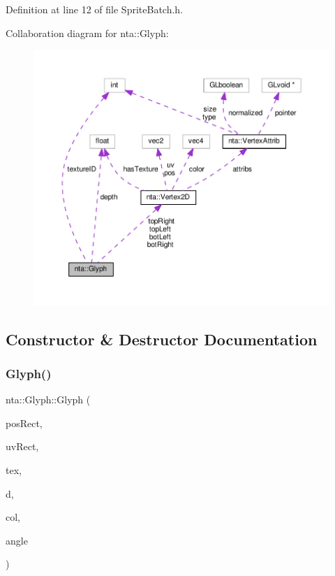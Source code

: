 Definition at line 12 of file Sprite\+Batch.\+h.



Collaboration diagram for nta\+:\+:Glyph\+:
\nopagebreak
\begin{figure}[H]
\begin{center}
\leavevmode
\includegraphics[width=350pt]{d8/d54/structnta_1_1Glyph__coll__graph}
\end{center}
\end{figure}


\subsection{Constructor \& Destructor Documentation}
\mbox{\label{structnta_1_1Glyph_a3b2afa4370140736d9d1b28de20d2105}} 
\subsubsection{\texorpdfstring{Glyph()}{Glyph()}}
{\footnotesize\ttfamily nta\+::\+Glyph\+::\+Glyph (\begin{DoxyParamCaption}\item[{crvec4}]{pos\+Rect,  }\item[{crvec4}]{uv\+Rect,  }\item[{G\+Luint}]{tex,  }\item[{float}]{d,  }\item[{crvec4}]{col,  }\item[{float}]{angle }\end{DoxyParamCaption})\hspace{0.3cm}{\ttfamily [inline]}}

